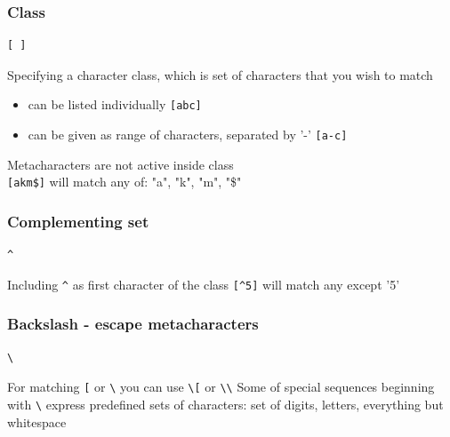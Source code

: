 \documentclass{beamer}
\begin{document}
\subsubsection{Class}
\begin{frame}[fragile]
\begin{verbatim}
[ ]
\end{verbatim}
Specifying a character class, which is set of characters that you wish to match
 \begin{itemize}
  \item can be listed individually \verb/[abc]/
  \item can be given as range of characters, separated by '-' \verb/[a-c]/
 \end{itemize}
\pause
Metacharacters are not active inside class \\
\verb/[akm$]/ will match any of: "a", "k", "m", "\$"
\end{frame}

\subsubsection{Complementing set}
\begin{frame}[fragile]
\begin{verbatim}
^
\end{verbatim}
Including \verb/^/ as first character of the class \verb/[^5]/ will match any except '5'
\end{frame}

\subsubsection{Backslash - escape metacharacters}
\begin{frame}[fragile]
\begin{verbatim}
\
\end{verbatim}
For matching \verb/[/ or \verb/\/ you can use \verb/\[/ or \verb/\\/
\pause
Some of special sequences beginning with \verb/\/ express predefined sets of characters: set of digits, letters, everything but whitespace
\end{frame}
\end{document}
